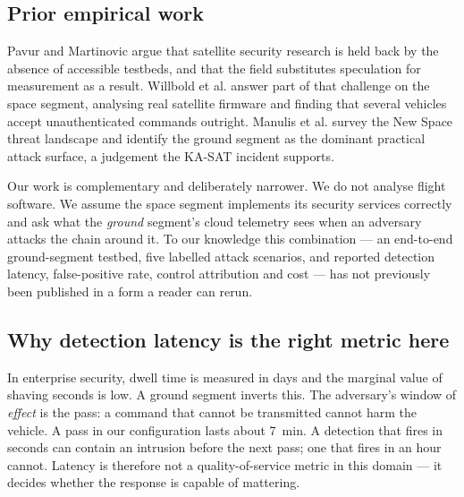 \subsection{Prior empirical work}

Pavur and Martinovic \cite{pavur2020launchpad} argue that satellite security
research is held back by the absence of accessible testbeds, and that the field
substitutes speculation for measurement as a result. Willbold et al.
\cite{willbold2023odyssey} answer part of that challenge on the space segment,
analysing real satellite firmware and finding that several vehicles accept
unauthenticated commands outright. Manulis et al. \cite{manulis2021newspace}
survey the New Space threat landscape and identify the ground segment as the
dominant practical attack surface, a judgement the KA-SAT incident
\cite{viasat2022} supports.

Our work is complementary and deliberately narrower. We do not analyse flight
software. We assume the space segment implements its security services correctly
and ask what the \emph{ground} segment's cloud telemetry sees when an adversary
attacks the chain around it. To our knowledge this combination --- an end-to-end
ground-segment testbed, five labelled attack scenarios, and reported detection
latency, false-positive rate, control attribution and cost --- has not previously
been published in a form a reader can rerun.

\subsection{Why detection latency is the right metric here}

In enterprise security, dwell time is measured in days and the marginal value of
shaving seconds is low. A ground segment inverts this. The adversary's window of
\emph{effect} is the pass: a command that cannot be transmitted cannot harm the
vehicle. A pass in our configuration lasts about \SI{7}{\minute}. A detection
that fires in seconds can contain an intrusion before the next pass; one that
fires in an hour cannot. Latency is therefore not a quality-of-service metric in
this domain --- it decides whether the response is capable of mattering.
